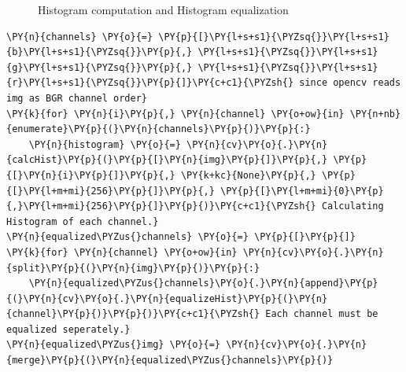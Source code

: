 \documentclass[a4paper,10pt]{article}%
\begin{document}
\begin{figure}[!h]
{	}
	\caption{Histogram computation and Histogram equalization}
\end{figure}    
    
    \begin{tcolorbox}[breakable, size=fbox, boxrule=1pt, pad at break*=1mm,colback=cellbackground, colframe=cellborder]
\begin{Verbatim}[commandchars=\\\{\}]
\PY{n}{channels} \PY{o}{=} \PY{p}{[}\PY{l+s+s1}{\PYZsq{}}\PY{l+s+s1}{b}\PY{l+s+s1}{\PYZsq{}}\PY{p}{,} \PY{l+s+s1}{\PYZsq{}}\PY{l+s+s1}{g}\PY{l+s+s1}{\PYZsq{}}\PY{p}{,} \PY{l+s+s1}{\PYZsq{}}\PY{l+s+s1}{r}\PY{l+s+s1}{\PYZsq{}}\PY{p}{]}\PY{c+c1}{\PYZsh{} since opencv reads img as BGR channel order}
\PY{k}{for} \PY{n}{i}\PY{p}{,} \PY{n}{channel} \PY{o+ow}{in} \PY{n+nb}{enumerate}\PY{p}{(}\PY{n}{channels}\PY{p}{)}\PY{p}{:}
    \PY{n}{histogram} \PY{o}{=} \PY{n}{cv}\PY{o}{.}\PY{n}{calcHist}\PY{p}{(}\PY{p}{[}\PY{n}{img}\PY{p}{]}\PY{p}{,} \PY{p}{[}\PY{n}{i}\PY{p}{]}\PY{p}{,} \PY{k+kc}{None}\PY{p}{,} \PY{p}{[}\PY{l+m+mi}{256}\PY{p}{]}\PY{p}{,} \PY{p}{[}\PY{l+m+mi}{0}\PY{p}{,}\PY{l+m+mi}{256}\PY{p}{]}\PY{p}{)}\PY{c+c1}{\PYZsh{} Calculating Histogram of each channel.}
\PY{n}{equalized\PYZus{}channels} \PY{o}{=} \PY{p}{[}\PY{p}{]}
\PY{k}{for} \PY{n}{channel} \PY{o+ow}{in} \PY{n}{cv}\PY{o}{.}\PY{n}{split}\PY{p}{(}\PY{n}{img}\PY{p}{)}\PY{p}{:}   
    \PY{n}{equalized\PYZus{}channels}\PY{o}{.}\PY{n}{append}\PY{p}{(}\PY{n}{cv}\PY{o}{.}\PY{n}{equalizeHist}\PY{p}{(}\PY{n}{channel}\PY{p}{)}\PY{p}{)}\PY{c+c1}{\PYZsh{} Each channel must be equalized seperately.} 
\PY{n}{equalized\PYZus{}img} \PY{o}{=} \PY{n}{cv}\PY{o}{.}\PY{n}{merge}\PY{p}{(}\PY{n}{equalized\PYZus{}channels}\PY{p}{)}    
\end{Verbatim}
\end{tcolorbox}
\end{document}
